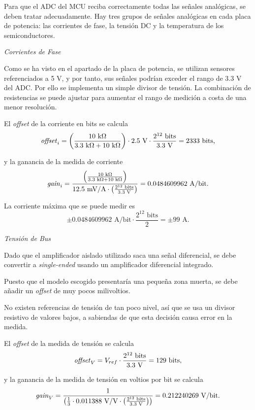 Para que el ADC del MCU reciba correctamente todas las señales analógicas, se deben tratar adecuadamente. Hay tres grupos de señales analógicas en cada placa de potencia: las corrientes de fase, la tensión DC y la temperatura de los semiconductores.

\textit{Corrientes de Fase}

Como se ha visto en el apartado de la placa de potencia, se utilizan sensores referenciados a 5 V, y por tanto, sus señales podrían exceder el rango de 3.3 V del ADC. Por ello se implementa un simple divisor de tensión. La combinación de resistencias se puede ajustar para aumentar el rango de medición a costa de una menor resolución. 

El \textit{offset} de la corriente en bits se calcula
\[ \text{\textit{offset}}_i = \left(\frac{10 \text{ k}\Omega}{3.3\text{ k}\Omega+10\text{ k}\Omega}\right) \cdot 2.5 \text{ V} \cdot \frac{2^{12} \text{ bits}}{3.3\text{ V}} = 2333 \text{ bits,} \]

y la ganancia de la medida de corriente
\[ \text{\textit{gain}}_i = \frac{\left(\frac{10\text{ k}\Omega}{3.3\text{ k}\Omega+10\text{ k}\Omega}\right)}{12.5 \text{ mV/A} \cdot \left(\frac{2^{12} \text{ bits}}{3.3\text{ V}}\right)} = 0.0484609962 \text{ A/bit.} \]

La corriente máxima que se puede medir es
\[ \pm 0.0484609962 \text{ A/bit} \cdot \frac{2^{12} \text{ bits}}{2} = \pm 99 \text{ A.} \]

\textit{Tensión de Bus}

Dado que el amplificador aislado utilizado saca una señal diferencial, se debe convertir a \textit{single-ended} usando un amplificador diferencial integrado. 

Puesto que el modelo escogido presentaría una pequeña zona muerta, se debe añadir un \textit{offset} de muy pocos milivoltios. 

No existen referencias de tensión de tan poco nivel, así que se usa un divisor resistivo de valores bajos, a sabiendas de que esta decisión causa error en la medida. 

El \textit{offset} de la medida de tensión se calcula
\[ \text{\textit{offset}}_V = V_{ref} \cdot \frac{2^{12} \text{ bits}}{3.3\text{ V}} = 129 \text{ bits,} \]

y la ganancia de la medida de tensión en voltios por bit se calcula
\[ \text{\textit{gain}}_V = \frac{1}{\left(\frac{1}{3} \cdot 0.011388 \text{ V/V} \cdot \left(\frac{2^{12} \text{ bits}}{3.3\text{ V}}\right)\right)} = 0.212240269 \text{ V/bit.} \]

